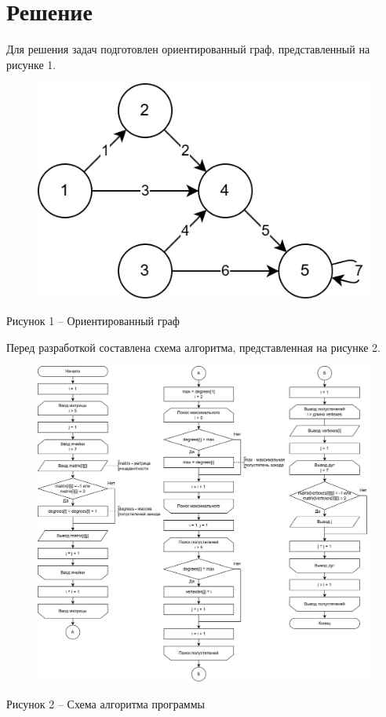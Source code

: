 \documentclass[a4paper,14pt]{extarticle}
\begin{document}
  \section*{\hspace{12.5mm}Решение}

  Для решения задач подготовлен ориентированный граф, представленный на рисунке 1.

  \begin{figure}[h]
    \centering
    \includegraphics[width=0.4\linewidth]{images/graph.png}
  \end{figure}
  \begin{center}
    Рисунок 1 – Ориентированный граф
  \end{center}

  \pagebreak
  Перед разработкой составлена схема алгоритма, представленная на рисунке 2.

  \begin{figure}[h]
    \centering
    \includegraphics[width=1\linewidth]{images/scheme.png}
  \end{figure}
  \begin{center}
    Рисунок 2 – Схема алгоритма программы
  \end{center}
\end{document}
